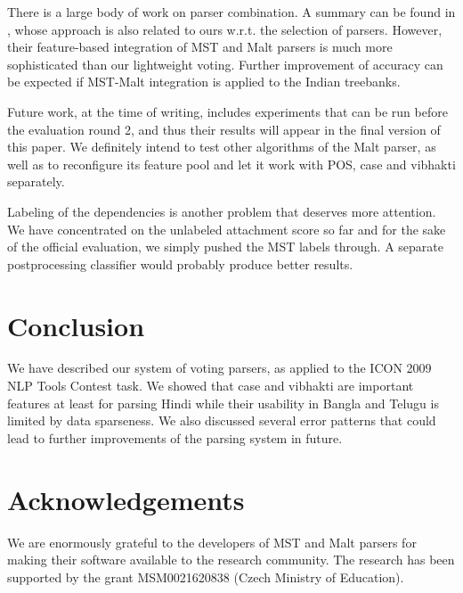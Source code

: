 \documentclass[11pt]{article}
\begin{document}
There is a large body of work on parser combination. A summary can be found in \citet{nivre-mcdonald:2008:ACLMain}, whose approach is also related to ours w.r.t. the selection of parsers. However, their feature-based integration of MST and Malt parsers is much more sophisticated than our lightweight voting. Further improvement of accuracy can be expected if MST-Malt integration is applied to the Indian treebanks.

Future work, at the time of writing, includes experiments that can be run before the evaluation round 2, and thus their results will appear in the final version of this paper. We definitely intend to test other algorithms of the Malt parser, as well as to reconfigure its feature pool and let it work with POS, case and vibhakti separately.

Labeling of the dependencies is another problem that deserves more attention. We have concentrated on the unlabeled attachment score so far and for the sake of the official evaluation, we simply pushed the MST labels through. A separate postprocessing classifier would probably produce better results.

\section{Conclusion}
\label{sec:concl}

We have described our system of voting parsers, as applied to the ICON 2009 NLP Tools Contest task. We showed that case and vibhakti are important features at least for parsing Hindi while their usability in Bangla and Telugu is limited by data sparseness. We also discussed several error patterns that could lead to further improvements of the parsing system in future.

\section*{Acknowledgements}

We are enormously grateful to the developers of MST and Malt parsers for making their software available to the research community.
The research has been supported by the grant 
MSM0021620838 (Czech Ministry of Education).

\begin{small}

\end{small}
\end{document}
